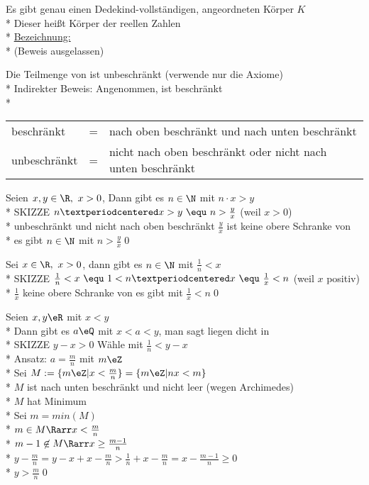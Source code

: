 Es gibt genau einen Dedekind-vollständigen, angeordneten Körper $K$\\*
Dieser heißt Körper der reellen Zahlen\\*
\ul{Bezeichnung:} \R\\*
(Beweis ausgelassen)

Die Teilmenge \N{} von \R{} ist unbeschränkt
\bew
(verwende nur die Axiome)\\*
Indirekter Beweis: Angenommen, \N{} ist beschränkt\\*
\begin{tabular}{lcl}
beschränkt &=& nach oben beschränkt und nach unten beschränkt\\*
unbeschränkt &=& nicht nach oben beschränkt oder nicht nach unten beschränkt
\end{tabular}
%
Seien $x,y\in\R,\ x>0$, Dann gibt es $n\in\N$ mit $n·x>y$\\*
SKIZZE %
%
\bew
$n·x>y\ \equ\ n>\frac{y}{x}$ (weil $x>0$)\\*
\N{} unbeschränkt und nicht nach oben beschränkt \Rarr{} $\frac{y}{x}$ ist keine obere Schranke von \N\\*
\Rarr{} es gibt $n\in\N$ mit $n>\frac{y}{x}$\qed

Sei $x\in\R,\ x>0$, dann gibt es $n\in\N$ mit $\frac{1}{n}<x$\\*
SKIZZE %
\bew
$\frac{1}{n}<x\ \equ\ 1<n·x\ \equ\ \frac{1}{x}<n$ (weil $x$ positiv)\\*
$\frac{1}{x}$ keine obere Schranke von \N{} \Rarr{} es gibt \nN{} mit $\frac{1}{x}<n$\qed

Seien $x,y\eR$ mit $x<y$\\*
Dann gibt es $a\eQ$ mit $x<a<y$, man sagt \Q{} liegen dicht in \R\\*
SKIZZE %
\bew
$y-x>0$ Wähle \nN{} mit $\frac{1}{n}<y-x$\\*
Ansatz: $a=\frac{m}{n}$ mit $m\eZ$\\*
Sei $M:=\{m\eZ|x<\frac{m}{n}\}=\{m\eZ|nx<m\}$\\*
$M$ ist nach unten beschränkt und nicht leer (wegen Archimedes)\\*
$M$ hat Minimum\\*
Sei $m=min(M)$\\*
$m\in M \Rarr x<\frac{m}{n}$\\*
$m-1\not\in M \Rarr x\geq\frac{m-1}{n}$\\*
$y-\frac{m}{n} =y-x+x-\frac{m}{n}>\frac{1}{n}+x-\frac{m}{n}=x-\frac{m-1}{n}\geq0$\\*
$y>\frac{m}{n}$\qed

